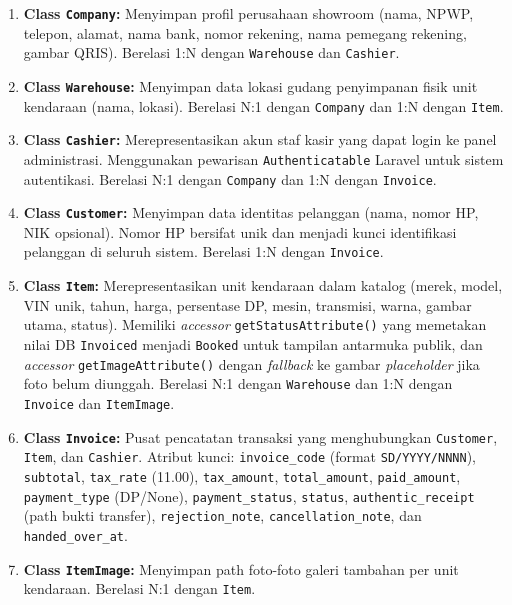 \documentclass[11pt, a5paper]{article}
\begin{document}
\begin{enumerate}[label=\arabic*.]
  \item \textbf{Class \texttt{Company}:} Menyimpan profil perusahaan showroom
        (nama, NPWP, telepon, alamat, nama bank, nomor rekening, nama pemegang
        rekening, gambar QRIS). Berelasi 1:N dengan \texttt{Warehouse} dan
        \texttt{Cashier}.

  \item \textbf{Class \texttt{Warehouse}:} Menyimpan data lokasi gudang
        penyimpanan fisik unit kendaraan (nama, lokasi). Berelasi N:1 dengan
        \texttt{Company} dan 1:N dengan \texttt{Item}.

  \item \textbf{Class \texttt{Cashier}:} Merepresentasikan akun staf kasir
        yang dapat login ke panel administrasi. Menggunakan pewarisan
        \texttt{Authenticatable} Laravel untuk sistem autentikasi. Berelasi
        N:1 dengan \texttt{Company} dan 1:N dengan \texttt{Invoice}.

  \item \textbf{Class \texttt{Customer}:} Menyimpan data identitas pelanggan
        (nama, nomor HP, NIK opsional). Nomor HP bersifat unik dan menjadi
        kunci identifikasi pelanggan di seluruh sistem. Berelasi 1:N dengan
        \texttt{Invoice}.

  \item \textbf{Class \texttt{Item}:} Merepresentasikan unit kendaraan dalam
        katalog (merek, model, VIN unik, tahun, harga, persentase DP, mesin,
        transmisi, warna, gambar utama, status). Memiliki \textit{accessor}
        \texttt{getStatusAttribute()} yang memetakan nilai DB \texttt{Invoiced}
        menjadi \texttt{Booked} untuk tampilan antarmuka publik, dan
        \textit{accessor} \texttt{getImageAttribute()} dengan \textit{fallback}
        ke gambar \textit{placeholder} jika foto belum diunggah. Berelasi N:1
        dengan \texttt{Warehouse} dan 1:N dengan \texttt{Invoice} dan
        \texttt{ItemImage}.

  \item \textbf{Class \texttt{Invoice}:} Pusat pencatatan transaksi yang
        menghubungkan \texttt{Customer}, \texttt{Item}, dan \texttt{Cashier}.
        Atribut kunci: \texttt{invoice\_code} (format \texttt{SD/YYYY/NNNN}),
        \texttt{subtotal}, \texttt{tax\_rate} (11.00), \texttt{tax\_amount},
        \texttt{total\_amount}, \texttt{paid\_amount}, \texttt{payment\_type}
        (DP/None), \texttt{payment\_status}, \texttt{status},
        \texttt{authentic\_receipt} (path bukti transfer),
        \texttt{rejection\_note}, \texttt{cancellation\_note}, dan
        \texttt{handed\_over\_at}.

  \item \textbf{Class \texttt{ItemImage}:} Menyimpan path foto-foto galeri
        tambahan per unit kendaraan. Berelasi N:1 dengan \texttt{Item}.
\end{enumerate}
\end{document}
